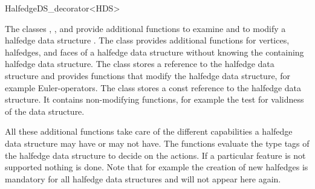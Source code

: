 
\ccRefPageBegin



\begin{ccRefClass}{HalfedgeDS_decorator<HDS>}

\ccDefinition
  
The classes ,
, and
 provide additional functions
to examine and to modify a halfedge data structure . The class
 provides additional functions
for vertices, halfedges, and faces of a halfedge data structure
without knowing the containing halfedge data structure. The class
 stores a reference to the halfedge
data structure and provides functions that modify the halfedge data
structure, for example Euler-operators. The class
 stores a const reference to
the halfedge data structure. It contains non-modifying functions, for
example the test for validness of the data structure.

All these additional functions take care of the different capabilities
a halfedge data structure may have or may not have.  The functions
evaluate the type tags of the halfedge data structure to decide on the
actions. If a particular feature is not supported nothing is done.
Note that for example the creation of new halfedges is mandatory for
all halfedge data structures and will not appear here again.


\ccInheritsFrom


\ccCreation
{}

\ccThreeToTwo


\end{ccRefClass}
